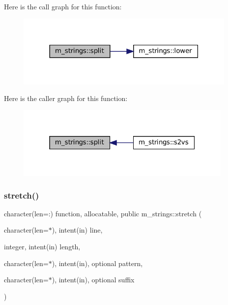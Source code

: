 Here is the call graph for this function\+:
\nopagebreak
\begin{figure}[H]
\begin{center}
\leavevmode
\includegraphics[width=306pt]{namespacem__strings_a3f0119fab962146c7656cad592dd9acd_cgraph}
\end{center}
\end{figure}
Here is the caller graph for this function\+:
\nopagebreak
\begin{figure}[H]
\begin{center}
\leavevmode
\includegraphics[width=301pt]{namespacem__strings_a3f0119fab962146c7656cad592dd9acd_icgraph}
\end{center}
\end{figure}
\mbox{\label{namespacem__strings_aa67b36ec70dbad84672d3069882929c5}} 
\subsubsection{\texorpdfstring{stretch()}{stretch()}}
{\footnotesize\ttfamily character(len=\+:) function, allocatable, public m\+\_\+strings\+::stretch (\begin{DoxyParamCaption}\item[{character(len=$\ast$), intent(in)}]{line,  }\item[{integer, intent(in)}]{length,  }\item[{character(len=$\ast$), intent(in), optional}]{pattern,  }\item[{character(len=$\ast$), intent(in), optional}]{suffix }\end{DoxyParamCaption})}



